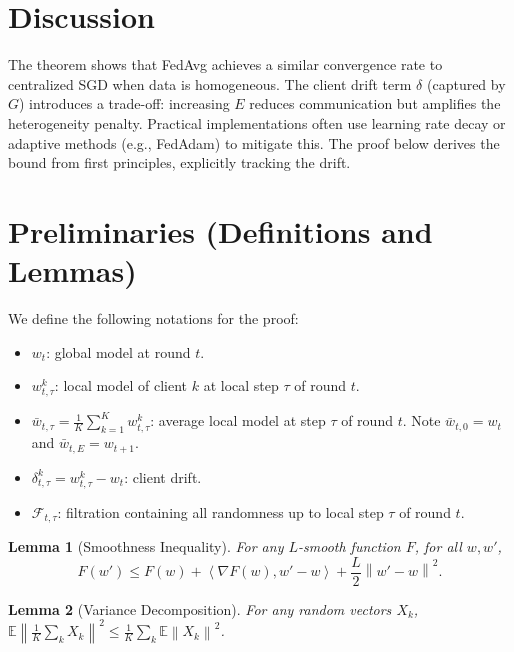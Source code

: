 \documentclass{article}
\newtheorem{lemma}{Lemma}
\newcommand{\norm}[1]{\left\| #1 \right\|}
\newcommand{\inner}[2]{\left\langle #1, #2 \right\rangle}
\begin{document}
\section*{Discussion}
The theorem shows that FedAvg achieves a similar convergence rate to centralized SGD when data is homogeneous. The client drift term $\delta$ (captured by $G$) introduces a trade-off: increasing $E$ reduces communication but amplifies the heterogeneity penalty. Practical implementations often use learning rate decay or adaptive methods (e.g., FedAdam) to mitigate this. The proof below derives the bound from first principles, explicitly tracking the drift.

\section*{Preliminaries (Definitions and Lemmas)}
We define the following notations for the proof:
\begin{itemize}
    \item $w_t$: global model at round $t$.
    \item $w_{t,\tau}^k$: local model of client $k$ at local step $\tau$ of round $t$.
    \item $\bar{w}_{t,\tau} = \frac{1}{K}\sum_{k=1}^K w_{t,\tau}^k$: average local model at step $\tau$ of round $t$. Note $\bar{w}_{t,0} = w_t$ and $\bar{w}_{t,E} = w_{t+1}$.
    \item $\delta_{t,\tau}^k = w_{t,\tau}^k - w_t$: client drift.
    \item $\mathcal{F}_{t,\tau}$: filtration containing all randomness up to local step $\tau$ of round $t$.
\end{itemize}

\begin{lemma}[Smoothness Inequality]
For any $L$-smooth function $F$, for all $w, w'$,
\begin{equation}
    F(w') \le F(w) + \inner{\nabla F(w)}{w' - w} + \frac{L}{2} \norm{w' - w}^2.
\end{equation}
\end{lemma}

\begin{lemma}[Variance Decomposition]
For any random vectors $X_k$, $\mathbb{E}\norm{\frac{1}{K}\sum_k X_k}^2 \le \frac{1}{K}\sum_k \mathbb{E}\norm{X_k}^2$.
\end{lemma}
\end{document}
